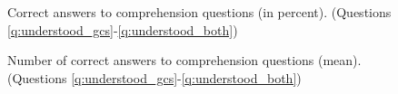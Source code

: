 \begin{figure}[h!]
    \caption[Comprehension]{Correct answers to comprehension questions (in percent). (Questions \ref{q:understood_gcs}-\ref{q:understood_both})}\label{fig:understood_each}
\end{figure}

\begin{figure}[h!]
    \caption[Comprehension score]{Number of correct answers to comprehension questions (mean). (Questions \ref{q:understood_gcs}-\ref{q:understood_both})}\label{fig:understood_score}
\end{figure}



